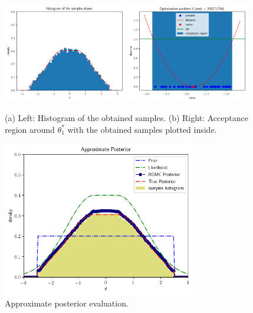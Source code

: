 \begin{figure}[h]
    \begin{center}
      \includegraphics[width=0.48\textwidth]{./latex_files/images/chapter3/example_marginal.png}
      \includegraphics[width=0.48\textwidth]{./latex_files/images/chapter3/example_region_samples.png}
    \end{center}
  \caption[Histogram of the obtained samples at the 1D example.]{(a) Left: Histogram of the obtained samples. (b) Right: Acceptance region around $\theta_1^*$ with the obtained samples plotted inside.}
  \label{fig:example_sampling}
\end{figure}

\begin{figure}[h]
    \begin{center}
      \includegraphics[width=0.75\textwidth]{./latex_files/images/chapter3/example_posterior.png}
    \end{center}
  \caption[Approximate posterior evaluation, at the 1D example.]{Approximate posterior evaluation.}
  \label{fig:approx_posterior}
\end{figure}
